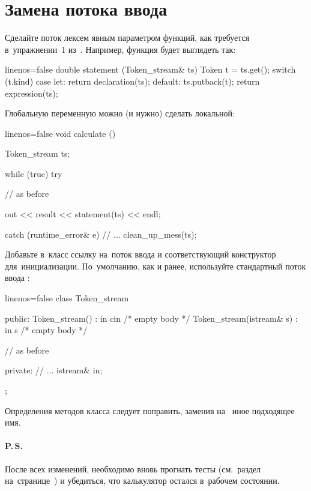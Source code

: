 \section{Замена потока ввода}
Сделайте поток лексем явным параметром функций, как требуется в~упражнении~1 из~. Например, функция  будет выглядеть так:

\begin{cppcode*}{linenos=false}
double statement (Token_stream& ts)
{
  Token t = ts.get();
  switch (t.kind)
  {
    case let:
      return declaration(ts);
    default:
      ts.putback(t);
      return expression(ts);
  }
}
\end{cppcode*}

\noindent Глобальную переменную  можно (и нужно) сделать локальной:
\begin{cppcode*}{linenos=false}
void calculate ()
{
  Token_stream ts;

  while (true)
  try
  {
// as before

    out << result << statement(ts) << endl;
  }
  catch (runtime_error& e)
  {
// ...
    clean_up_mess(ts);
  }
}
\end{cppcode*}

\noindent Добавьте в~класс  ссылку на~поток ввода и соответствующий конструктор для~инициализации. По~умолчанию, как и ранее, используйте стандартный поток ввода :

\begin{cppcode*}{linenos=false}
class Token_stream
{
  public:
  Token_stream() : in{ cin } {/* empty body */}
  Token_stream(istream& s) : in{ s } {/* empty body */}

// as before

  private:
// ...
  istream& in;
};
\end{cppcode*}

\noindent Определения методов класса следует поправить, заменив  на~ иное подходящее имя.



\paragraph{P.\,S.}
После всех изменений, необходимо вновь прогнать тесты (см.~раздел на~странице~\pageref{sect:autotests}) и убедиться, что калькулятор остался в~рабочем состоянии.



